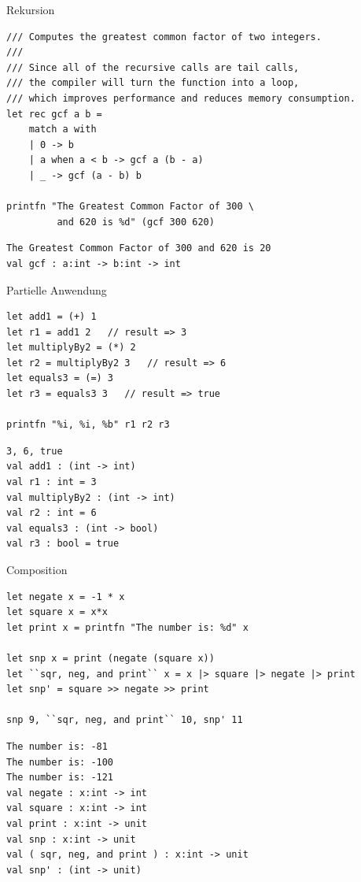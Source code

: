 \documentclass[t]{beamer}
\begin{document}
\begin{frame}[label={sec:org6cc256e},fragile]{Rekursion}
 \begin{verbatim}
/// Computes the greatest common factor of two integers.
///
/// Since all of the recursive calls are tail calls,
/// the compiler will turn the function into a loop,
/// which improves performance and reduces memory consumption.
let rec gcf a b =
    match a with
    | 0 -> b
    | a when a < b -> gcf a (b - a)
    | _ -> gcf (a - b) b

printfn "The Greatest Common Factor of 300 \
         and 620 is %d" (gcf 300 620)
\end{verbatim}

\begin{verbatim}
The Greatest Common Factor of 300 and 620 is 20
val gcf : a:int -> b:int -> int
\end{verbatim}
\end{frame}

\begin{frame}[label={sec:org825f28c},fragile]{Partielle Anwendung}
 \scriptsize

\begin{verbatim}
let add1 = (+) 1        
let r1 = add1 2   // result => 3
let multiplyBy2 = (*) 2
let r2 = multiplyBy2 3   // result => 6
let equals3 = (=) 3
let r3 = equals3 3   // result => true

printfn "%i, %i, %b" r1 r2 r3
\end{verbatim}

\begin{verbatim}
3, 6, true
val add1 : (int -> int)
val r1 : int = 3
val multiplyBy2 : (int -> int)
val r2 : int = 6
val equals3 : (int -> bool)
val r3 : bool = true
\end{verbatim}
\end{frame}

\begin{frame}[label={sec:org1d9cca3},fragile]{Composition}
 \scriptsize

\begin{verbatim}
let negate x = -1 * x
let square x = x*x
let print x = printfn "The number is: %d" x

let snp x = print (negate (square x))
let ``sqr, neg, and print`` x = x |> square |> negate |> print
let snp' = square >> negate >> print

snp 9, ``sqr, neg, and print`` 10, snp' 11
\end{verbatim}

\begin{verbatim}
The number is: -81
The number is: -100
The number is: -121
val negate : x:int -> int
val square : x:int -> int
val print : x:int -> unit
val snp : x:int -> unit
val ( sqr, neg, and print ) : x:int -> unit
val snp' : (int -> unit)
\end{verbatim}
\end{frame}
\end{document}
